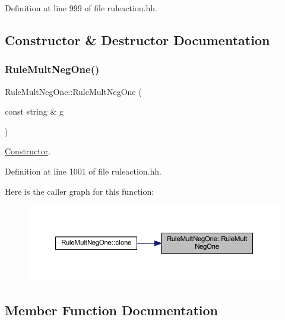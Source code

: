 Definition at line 999 of file ruleaction.\+hh.



\subsection{Constructor \& Destructor Documentation}
\mbox{\label{class_rule_mult_neg_one_a433ee18fe0cbf544db9c6d53424eba0e}} 
\subsubsection{\texorpdfstring{RuleMultNegOne()}{RuleMultNegOne()}}
{\footnotesize\ttfamily Rule\+Mult\+Neg\+One\+::\+Rule\+Mult\+Neg\+One (\begin{DoxyParamCaption}\item[{const string \&}]{g }\end{DoxyParamCaption})\hspace{0.3cm}{\ttfamily [inline]}}



\mbox{\hyperlink{class_constructor}{Constructor}}. 



Definition at line 1001 of file ruleaction.\+hh.

Here is the caller graph for this function\+:
\nopagebreak
\begin{figure}[H]
\begin{center}
\leavevmode
\includegraphics[width=350pt]{class_rule_mult_neg_one_a433ee18fe0cbf544db9c6d53424eba0e_icgraph}
\end{center}
\end{figure}


\subsection{Member Function Documentation}
\mbox{\label{class_rule_mult_neg_one_a3a1d3552604a9d5464f23ef332376918}} 

